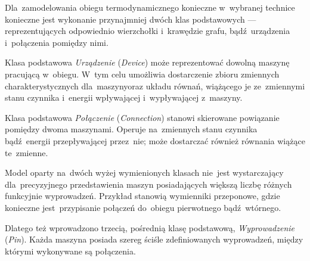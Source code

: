 Dla~zamodelowania obiegu termodynamicznego konieczne w~wybranej technice
konieczne jest wykonanie przynajmniej dwóch klas podstawowych ---
reprezentujących odpowiednio wierzchołki i~krawędzie grafu,
bądź~urządzenia i~połączenia pomiędzy nimi.

Klasa podstawowa \textit{Urządzenie} (\textit{Device}) może
reprezentować dowolną maszynę pracującą w~obiegu. W~tym celu umożliwia
dostarczenie zbioru zmiennych charakterystycznych dla~maszynyoraz układu
równań, wiążącego je ze~zmiennymi stanu czynnika i~energii wpływającej
i~wypływającej z~maszyny.

Klasa podstawowa \textit{Połączenie} (\textit{Connection}) stanowi
skierowane powiązanie pomiędzy dwoma maszynami. Operuje na~zmiennych
stanu czynnika bądź~energii przepływającej przez~nie; może dostarczać
również równania wiążące te~zmienne.

Model oparty na~dwóch wyżej wymienionych klasach nie~jest wystarczający
dla~precyzyjnego przedstawienia maszyn posiadających większą liczbę
różnych funkcyjnie wyprowadzeń. Przykład stanowią wymienniki przeponowe,
gdzie konieczne jest~przypisanie połączeń do~obiegu pierwotnego
bądź~wtórnego.

Dlatego też wprowadzono trzecią, pośrednią klasę podstawową,
\textit{Wyprowadzenie} (\textit{Pin}). Każda maszyna posiada szereg
ściśle zdefiniowanych wyprowadzeń, między którymi wykonywane są
połączenia.


